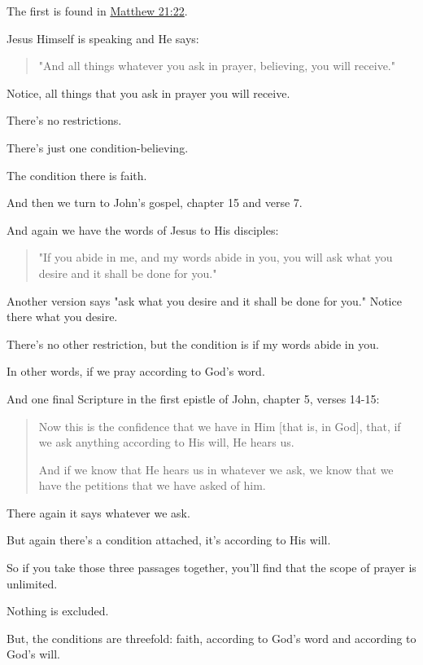 \documentclass[11pt]{article}
\begin{document}
The first is found in \href{https://www.biblegateway.com/passage/?search=Matthew\%2021\%3A22\&version=ESV}{Matthew 21:22}.

Jesus Himself is speaking and He says:

\begin{quote}
"And all things whatever you ask in prayer, believing, you will receive."
\end{quote}

Notice, all things that you ask in prayer you will
receive.

There's no restrictions.

There's just one condition-believing.

The condition there is faith.

And then we turn to John's gospel, chapter 15
and verse 7.

And again we have the words of Jesus to His
disciples:

\begin{quote}
"If you abide in me, and my words
abide in you, you will ask what you desire and
it shall be done for you."
\end{quote}

Another version says "ask what you desire and it shall be done
for you." Notice there what you desire.

There's no other restriction, but the
condition is if my words abide in you.

In other words, if we pray according to God's
word.

And one final Scripture in the first epistle
of John, chapter 5, verses 14-15:

\begin{quote}
Now this is the confidence that we have in
Him [that is, in God], that, if we ask
anything according to His will, He hears us.

And if we know that He hears us in whatever
we ask, we know that we have the petitions
that we have asked of him.
\end{quote}

There again it says whatever we ask.

But again there's a condition attached, it's
according to His will.

So if you take those three passages together,
you'll find that the scope of prayer is
unlimited.

Nothing is excluded.

But, the conditions are threefold: faith,
according to God's word and according to God's
will.
\end{document}
